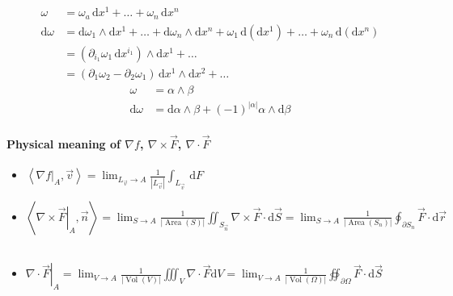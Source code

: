 \begin{align*}
    \omega
     & =\omega_a\,\mathrm{d}x^1+\dots+\omega_n\,\mathrm{d}x^n                                                                                                           \\
    \mathrm{d}\omega
     & =\mathrm{d}\omega_1\wedge\mathrm{d}x^1+\dots+\mathrm{d}\omega_n\wedge\mathrm{d}x^n+\omega_1\,\mathrm{d}(\mathrm{d}x^1)+\dots+\omega_n\,\mathrm{d}(\mathrm{d}x^n) \\
     & =\left(\partial_{i_1}\omega_1\,\mathrm{d}x^{i_1}\right)\wedge\mathrm{d}x^1+\dots                                                                                 \\
     & =(\partial_1\omega_2-\partial_2\omega_1)\,\mathrm{d}x^1\wedge\mathrm{d}x^2+\dots
\end{align*}
\begin{align*}
    \omega           & =\alpha\wedge\beta                                                      \\
    \mathrm{d}\omega & =\mathrm{d}\alpha\wedge\beta+(-1)^{|\alpha|}\alpha\wedge\mathrm{d}\beta
\end{align*}

\paragraph*{Physical meaning of $\nabla f$, $\nabla\times\overrightarrow{F}$, $\nabla\cdot\overrightarrow{F}$}

\begin{itemize}
    \item $\left<\left.\nabla f\right|_A,\overrightarrow{v}\right>=\lim_{L_{\overrightarrow{v}}\to A}\frac{1}{\left|L_{\overrightarrow{v}}\right|}\int_{L_{\overrightarrow{v}}}\,\mathrm{d}F$
    \item $\left<\left.\nabla\times\overrightarrow{F}\right|_A,\overrightarrow{n}\right>=\lim_{S\to A}\frac{1}{\left|\operatorname{Area}(S)\right|}\iint_{S_{\overrightarrow{n}}}\nabla\times\overrightarrow{F}\cdot\mathrm{d}\overrightarrow{S}=\lim_{S\to A}\frac{1}{\left|\operatorname{Area}(S_n)\right|}\oint_{\partial S_n}\overrightarrow{F}\cdot\mathrm{d}\overrightarrow{r}$\
    \item $\left.\nabla\cdot\overrightarrow{F}\right|_A=\lim_{V\to A}\frac{1}{\left|\operatorname{Vol}(V)\right|}\iiint_V\nabla\cdot\overrightarrow{F}\mathrm{d}V=\lim_{V\to A}\frac{1}{\left|\operatorname{Vol}(\Omega)\right|}\oiint_{\partial\Omega}\overrightarrow{F}\cdot\mathrm{d}\overrightarrow{S}$
\end{itemize}

